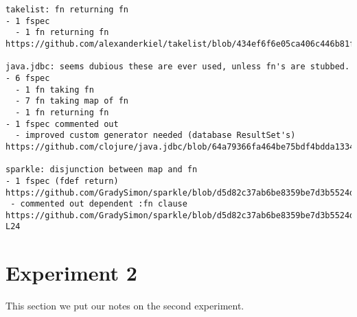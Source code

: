 \begin{verbatim}
takelist: fn returning fn
- 1 fspec
  - 1 fn returning fn
https://github.com/alexanderkiel/takelist/blob/434ef6f6e05ca406c446b81fa5a77c7f0519c355/src/takelist/app.clj#L27

java.jdbc: seems dubious these are ever used, unless fn's are stubbed.
- 6 fspec
  - 1 fn taking fn
  - 7 fn taking map of fn
  - 1 fn returning fn
- 1 fspec commented out
  - improved custom generator needed (database ResultSet's)
https://github.com/clojure/java.jdbc/blob/64a79366fa464be75bdf4bdda133441b9d1efb26/src/main/clojure/clojure/java/jdbc/spec.clj#L124

sparkle: disjunction between map and fn
- 1 fspec (fdef return)
https://github.com/GradySimon/sparkle/blob/d5d82c37ab6be8359be7d3b5524d8b32dac452a1/src/sparkle/layer.clj#L9
 - commented out dependent :fn clause
https://github.com/GradySimon/sparkle/blob/d5d82c37ab6be8359be7d3b5524d8b32dac452a1/src/sparkle/spec.clj#L18-L24
\end{verbatim}
\endgroup

\section{Experiment 2}
\label{appendix2}

This section we put our notes on the second experiment.

